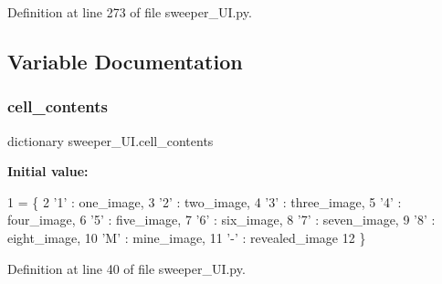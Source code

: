 Definition at line 273 of file sweeper\+\_\+\+U\+I.\+py.



\subsection{Variable Documentation}
\mbox{\label{namespacesweeper___u_i_a7d0e80394d61cdf349f0f82925f988a1}} 
\subsubsection{\texorpdfstring{cell\+\_\+contents}{cell\_contents}}
{\footnotesize\ttfamily dictionary sweeper\+\_\+\+U\+I.\+cell\+\_\+contents}

{\bfseries Initial value\+:}
\begin{DoxyCode}
1 =  \{
2     \textcolor{stringliteral}{'1'} : one\_image,
3     \textcolor{stringliteral}{'2'} : two\_image,
4     \textcolor{stringliteral}{'3'} : three\_image,
5     \textcolor{stringliteral}{'4'} : four\_image,
6     \textcolor{stringliteral}{'5'} : five\_image,
7     \textcolor{stringliteral}{'6'} : six\_image,
8     \textcolor{stringliteral}{'7'} : seven\_image,
9     \textcolor{stringliteral}{'8'} : eight\_image,
10     \textcolor{stringliteral}{'M'} : mine\_image,
11     \textcolor{stringliteral}{'-'} : revealed\_image
12 \}
\end{DoxyCode}


Definition at line 40 of file sweeper\+\_\+\+U\+I.\+py.


